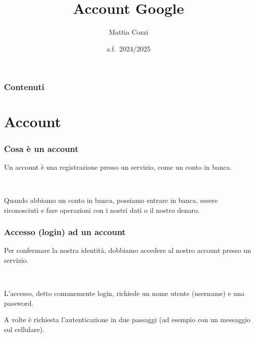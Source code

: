\documentclass[handout]{beamer}
\title{Account Google}
\author{Mattia Cozzi}
\date{a.f.~2024/2025}
\begin{document}
\begin{frame}
  \titlepage
\end{frame}


\begin{frame}
\frametitle{Contenuti}
\tableofcontents
\end{frame}



\section{Account}


\begin{frame}
\frametitle{Cosa è un account}
Un account è una \alert{registrazione presso un servizio}, come un conto in banca.\pause

~

Quando abbiamo un conto in banca, possiamo entrare in banca, essere riconosciuti e fare operazioni con i nostri dati o il nostro denaro.

\end{frame}




\begin{frame}
\frametitle{Accesso (login) ad un account}
Per confermare la nostra identità, dobbiamo \alert{accedere al nostro account} presso un servizio.\pause

~

L'accesso, detto comunemente \alert{login}, richiede un \alert{nome utente (username)} e una \alert{password}.

A volte è richiesta l'autenticazione in due passaggi (ad esempio con un messaggio sul cellulare).

\end{frame}
\end{document}
